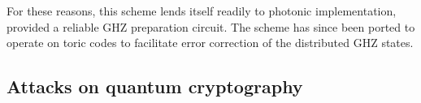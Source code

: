 For these reasons, this scheme lends itself readily to photonic implementation, provided a reliable GHZ preparation circuit. The scheme has since been ported to operate on toric codes to facilitate error correction of the distributed GHZ states.

%
%

\subsection{Attacks on quantum cryptography}



